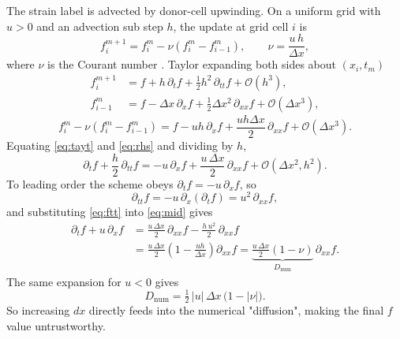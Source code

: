 \documentclass[11pt,a4paper]{report}
\begin{document}
The strain label is advected by donor-cell upwinding. On a uniform grid with $u>0$ and an
advection sub step $h$, the update at grid cell $i$ is
\begin{equation}
	f_i^{m+1} = f_i^m - \nu\left(f_i^m - f_{i-1}^m\right),
	\qquad \nu = \frac{u\,h}{\Delta x},
	\label{eq:upwind}
\end{equation}
where $\nu$ is the Courant number \cite{Leveque}. Taylor expanding both sides about $(x_i,t_m)$
\begin{align}
	f_i^{m+1} &= f + h\,\partial_t f + \tfrac{1}{2}h^2\,\partial_{tt} f + \mathcal{O}(h^3),
	\label{eq:tayt}\\
	f_{i-1}^m &= f - \Delta x\,\partial_x f + \tfrac{1}{2}\Delta x^2\,\partial_{xx} f
	+ \mathcal{O}(\Delta x^3),
	\label{eq:tayx}
\end{align}
\begin{equation}
	f_i^m - \nu\left(f_i^m - f_{i-1}^m\right)
	= f - u h\,\partial_x f + \frac{u h \Delta x}{2}\,\partial_{xx} f
	+ \mathcal{O}(\Delta x^3).
	\label{eq:rhs}
\end{equation}
Equating \eqref{eq:tayt} and \eqref{eq:rhs} and dividing by $h$,
\begin{equation}
	\partial_t f + \frac{h}{2}\,\partial_{tt} f
	= -u\,\partial_x f + \frac{u\,\Delta x}{2}\,\partial_{xx} f
	+ \mathcal{O}(\Delta x^2, h^2).
	\label{eq:mid}
\end{equation}
To leading order the scheme obeys $\partial_t f = -u\,\partial_x f$, so
\begin{equation}
	\partial_{tt} f = -u\,\partial_x\!\left(\partial_t f\right) = u^2\,\partial_{xx} f,
	\label{eq:ftt}
\end{equation}
and substituting \eqref{eq:ftt} into \eqref{eq:mid} gives
\begin{align}
	\partial_t f + u\,\partial_x f
	&= \frac{u\,\Delta x}{2}\,\partial_{xx} f - \frac{h\,u^2}{2}\,\partial_{xx} f \nonumber\\
	&= \frac{u\,\Delta x}{2}\left(1 - \frac{u h}{\Delta x}\right)\partial_{xx} f
	= \underbrace{\frac{u\,\Delta x}{2}\left(1-\nu\right)}_{\textstyle D_{\mathrm{num}}}\,
	\partial_{xx} f .
	\label{eq:modified}
\end{align}
The same expansion for $u<0$ gives
\begin{equation}
	{\;D_{\mathrm{num}} = \tfrac{1}{2}\,\lvert u\rvert\,\Delta x\,
		\bigl(1-\lvert\nu\rvert\bigr).\;}
	\label{eq:dnum}
\end{equation}
So increasing $dx$ directly feeds into the numerical "diffusion", making the final $f$ value untrustworthy.
\end{document}
